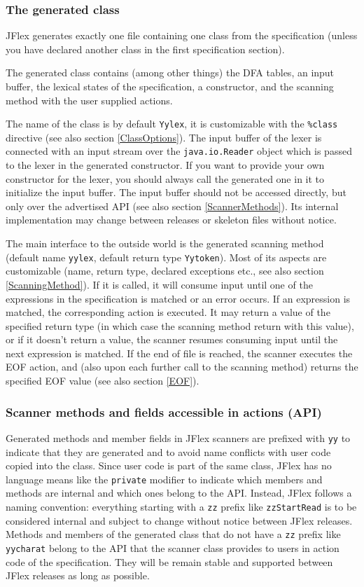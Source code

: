 \documentclass[11pt]{scrartcl}
\begin{document}
\subsubsection{The generated class}
JFlex generates exactly one file containing one class from the specification
(unless you have declared another class in the first specification section).

The generated class contains (among other things) the DFA tables, an input buffer, 
the lexical states of the specification, a constructor, and the scanning method
with the user supplied actions.

The name of the class is by default \texttt{Yylex}, it is customizable
with the \texttt{\%class} directive (see also section
\ref{ClassOptions}). The input buffer of the lexer is connected with an
input stream over the \texttt{java.io.Reader} object which is passed
to the lexer in the generated constructor. If you want to provide your
own constructor for the lexer, you should always call the generated
one in it to initialize the input buffer. The input buffer should not
be accessed directly, but only over the advertised API (see also
section \ref{ScannerMethods}). Its internal implementation may change
between releases or skeleton files without notice.

The main interface to the outside world is the generated scanning
method (default name \texttt{yylex}, default return type
\texttt{Yytoken}). Most of its aspects are customizable (name, return
type, declared exceptions etc., see also section
\ref{ScanningMethod}).  If it is called, it will consume input until
one of the expressions in the specification is matched or an error
occurs. If an expression is matched, the corresponding action is
executed. It may return a value of the specified return type (in which
case the scanning method return with this value), or if it doesn't
return a value, the scanner resumes consuming input until the next
expression is matched. If the end of file is reached, the scanner
executes the EOF action, and (also upon each further call to the scanning
method) returns the specified EOF value (see also section \ref{EOF}).


\subsubsection{Scanner methods and fields accessible in actions (API)\label{ScannerMethods}}
Generated methods and member fields in JFlex scanners are prefixed
with \texttt{yy} to indicate that they are generated and to avoid name
conflicts with user code copied into the class. Since user code is
part of the same class, JFlex has no language means like the
\texttt{private} modifier to indicate which members and methods are
internal and which ones belong to the API. Instead, JFlex follows a
naming convention: everything starting with a \texttt{zz} prefix like
\texttt{zzStartRead} is to be considered internal and subject to
change without notice between JFlex releases. Methods and members of
the generated class that do not have a \texttt{zz} prefix like
\texttt{yycharat} belong to the API that the scanner class provides to
users in action code of the specification. They will be remain stable
and supported between JFlex releases as long as possible.
\end{document}
